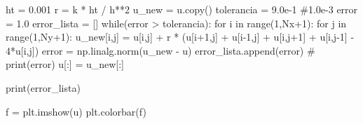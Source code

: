 \documentclass[
  letterpaper,
  DIV=11,
  numbers=noendperiod]{scrreprt}
\newenvironment{Shaded}{\begin{snugshade}}{\end{snugshade}}
\newcommand{\BuiltInTok}[1]{\textcolor[rgb]{0.00,0.23,0.31}{#1}}
\newcommand{\CommentTok}[1]{\textcolor[rgb]{0.37,0.37,0.37}{#1}}
\newcommand{\ControlFlowTok}[1]{\textcolor[rgb]{0.00,0.23,0.31}{#1}}
\newcommand{\DecValTok}[1]{\textcolor[rgb]{0.68,0.00,0.00}{#1}}
\newcommand{\FloatTok}[1]{\textcolor[rgb]{0.68,0.00,0.00}{#1}}
\newcommand{\KeywordTok}[1]{\textcolor[rgb]{0.00,0.23,0.31}{#1}}
\newcommand{\NormalTok}[1]{\textcolor[rgb]{0.00,0.23,0.31}{#1}}
\newcommand{\OperatorTok}[1]{\textcolor[rgb]{0.37,0.37,0.37}{#1}}
\begin{document}
\begin{Shaded}
\begin{Highlighting}[]
\NormalTok{ht }\OperatorTok{=} \FloatTok{0.001}
\NormalTok{r }\OperatorTok{=}\NormalTok{ k }\OperatorTok{*}\NormalTok{ ht }\OperatorTok{/}\NormalTok{ h}\OperatorTok{**}\DecValTok{2}
\NormalTok{u\_new }\OperatorTok{=}\NormalTok{ u.copy()}
\NormalTok{tolerancia }\OperatorTok{=} \FloatTok{9.0e{-}1} \CommentTok{\#1.0e{-}3}
\NormalTok{error }\OperatorTok{=} \FloatTok{1.0}
\NormalTok{error\_lista }\OperatorTok{=}\NormalTok{ []}
\ControlFlowTok{while}\NormalTok{(error }\OperatorTok{\textgreater{}}\NormalTok{ tolerancia):}
    \ControlFlowTok{for}\NormalTok{ i }\KeywordTok{in} \BuiltInTok{range}\NormalTok{(}\DecValTok{1}\NormalTok{,Nx}\OperatorTok{+}\DecValTok{1}\NormalTok{):}
        \ControlFlowTok{for}\NormalTok{ j }\KeywordTok{in} \BuiltInTok{range}\NormalTok{(}\DecValTok{1}\NormalTok{,Ny}\OperatorTok{+}\DecValTok{1}\NormalTok{):}
\NormalTok{            u\_new[i,j] }\OperatorTok{=}\NormalTok{ u[i,j] }\OperatorTok{+}\NormalTok{ r }\OperatorTok{*}\NormalTok{ (u[i}\OperatorTok{+}\DecValTok{1}\NormalTok{,j] }\OperatorTok{+}\NormalTok{ u[i}\OperatorTok{{-}}\DecValTok{1}\NormalTok{,j] }\OperatorTok{+}\NormalTok{ u[i,j}\OperatorTok{+}\DecValTok{1}\NormalTok{] }\OperatorTok{+}\NormalTok{ u[i,j}\OperatorTok{{-}}\DecValTok{1}\NormalTok{] }\OperatorTok{{-}} \DecValTok{4}\OperatorTok{*}\NormalTok{u[i,j])}
\NormalTok{    error }\OperatorTok{=}\NormalTok{ np.linalg.norm(u\_new }\OperatorTok{{-}}\NormalTok{ u)}
\NormalTok{    error\_lista.append(error)}
\CommentTok{\#    print(error)}
\NormalTok{    u[:] }\OperatorTok{=}\NormalTok{ u\_new[:]}

\BuiltInTok{print}\NormalTok{(error\_lista)}

\NormalTok{f }\OperatorTok{=}\NormalTok{ plt.imshow(u)}
\NormalTok{plt.colorbar(f)}
\end{Highlighting}
\end{Shaded}
\end{document}
